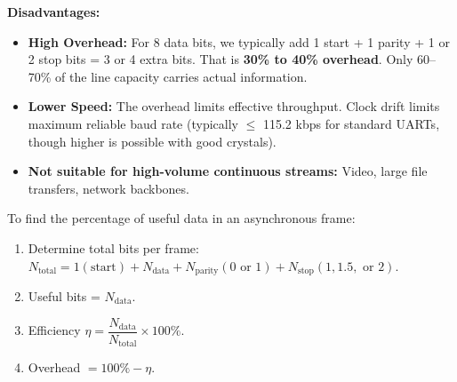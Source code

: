 \documentclass[11pt]{article}
\begin{document}
\textbf{Disadvantages:}
\begin{itemize}
    \item \textbf{High Overhead:} For 8 data bits, we typically add 1 start + 1 parity + 1 or 2 stop bits = 3 or 4 extra bits. That is \textbf{30\% to 40\% overhead}. Only 60--70\% of the line capacity carries actual information.
    \item \textbf{Lower Speed:} The overhead limits effective throughput. Clock drift limits maximum reliable baud rate (typically $\le$ 115.2 kbps for standard UARTs, though higher is possible with good crystals).
    \item \textbf{Not suitable for high-volume continuous streams:} Video, large file transfers, network backbones.
\end{itemize}

\begin{methode}
To find the percentage of useful data in an asynchronous frame:
\begin{enumerate}
    \item Determine total bits per frame: $N_{\text{total}} = 1 (\text{start}) + N_{\text{data}} + N_{\text{parity}} (0 \text{ or } 1) + N_{\text{stop}} (1, 1.5, \text{ or } 2)$.
    \item Useful bits = $N_{\text{data}}$.
    \item Efficiency $\eta = \dfrac{N_{\text{data}}}{N_{\text{total}}} \times 100\%$.
    \item Overhead $= 100\% - \eta$.
\end{enumerate}
\end{methode}
\end{document}
